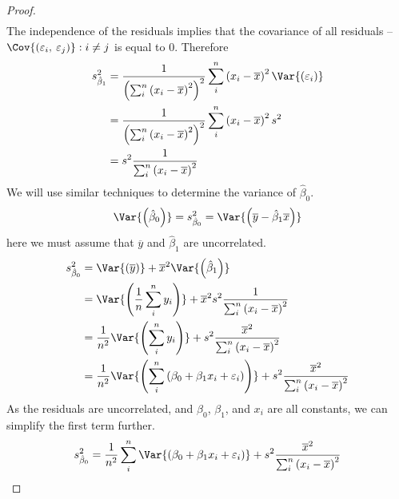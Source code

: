 \documentclass{article}
\begin{document}
\begin{proof}
\begin{align*}
    \end{align*}
    The independence of the residuals implies that the covariance of all residuals -- $\Cov{\left( \varepsilon_i,\: \varepsilon_j \right)}:i \neq j$ is equal to 0. Therefore
    \begin{align*}
        s_{\hat{\beta}_1}^2 & = \frac{1}{\left( \sum_i^n \left( x_i - \overline{x} \right)^2 \right)^2} \sum_i^n \left( x_i - \overline{x} \right)^2 \Var{\left( \varepsilon_i \right)} \\
                            & = \frac{1}{\left( \sum_i^n \left( x_i - \overline{x} \right)^2 \right)^2} \sum_i^n \left( x_i - \overline{x} \right)^2 s^2                                \\
                            & = s^2 \frac{1}{\sum_i^n \left( x_i - \overline{x} \right)^2}
    \end{align*}
    We will use similar techniques to determine the variance of $\hat{\beta}_0$.
    \begin{equation*}
        \Var{\left( \hat{\beta}_0 \right)} = s_{\hat{\beta}_0}^2 = \Var{\left( \overline{y} - \hat{\beta}_1 \overline{x} \right)}
    \end{equation*}
    here we must assume that $\overline{y}$ and $\hat{\beta}_1$ are uncorrelated.
    \begin{align*}
        s_{\hat{\beta}_0}^2 & = \Var{\left( \overline{y} \right)} + \overline{x}^2 \Var{\left( \hat{\beta}_1 \right)}                                                                                   \\
                            & = \Var{\left( \frac{1}{n}\sum_i^ny_i \right)} + \overline{x}^2 s^2 \frac{1}{\sum_i^n \left( x_i - \overline{x} \right)^2}                                                 \\
                            & = \frac{1}{n^2}\Var{\left( \sum_i^ny_i \right)} + s^2 \frac{\overline{x}^2}{\sum_i^n \left( x_i - \overline{x} \right)^2}                                                 \\
                            & = \frac{1}{n^2}\Var{\left( \sum_i^n\left( \beta_0 + \beta_1x_i + \varepsilon_i \right) \right)} + s^2 \frac{\overline{x}^2}{\sum_i^n \left( x_i - \overline{x} \right)^2}
    \end{align*}
    As the residuals are uncorrelated, and $\beta_0$, $\beta_1$, and $x_i$ are all constants, we can simplify the first term further.
    \begingroup
    \allowdisplaybreaks
    \begin{align*}
        s_{\hat{\beta}_0}^2 & = \frac{1}{n^2} \sum_i^n\Var{\left( \beta_0 + \beta_1x_i + \varepsilon_i \right)} + s^2 \frac{\overline{x}^2}{\sum_i^n \left( x_i - \overline{x} \right)^2}                                                        \\

\end{align*}
\end{proof}
\end{document}
